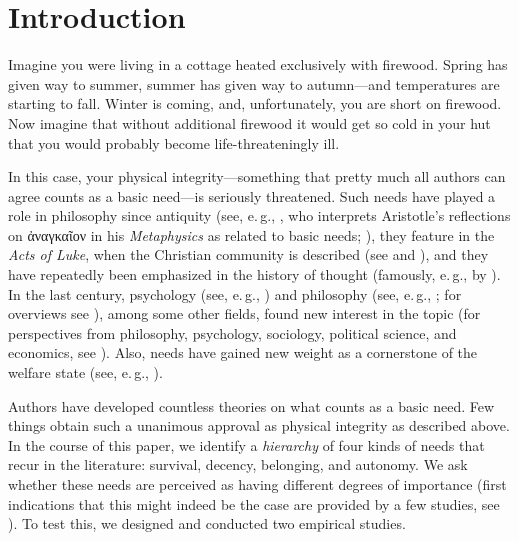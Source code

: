 \documentclass[10pt,letterpaper]{article}
\begin{document}
\linenumbers


\section*{Introduction}\label{sec:introduction}
Imagine you were living in a cottage heated exclusively with firewood.
Spring has given way to summer, summer has given way to autumn---and temperatures are starting to fall.
Winter is coming, and, unfortunately, you are short on firewood.
Now imagine that without additional firewood it would get so cold in your hut that you would probably become life-threateningly ill.

In this case, your physical integrity---something that pretty much all authors can agree counts as a basic need---is seriously threatened.
Such needs have played a role in philosophy since antiquity (see, e.\,g., \cite{poelzler_basic_2021}, who interprets Aristotle's reflections on \textgreek{ἀναγκαῖον} in his \textit{Metaphysics} as related to basic needs; \cite[1015a20--1015b15]{aristotle_metaphysics_1933}), they feature in the \textit{Acts of Luke}, when the Christian community is described (see \cite[p. 141f.]{luke_apostelgeschichte_2016} and \cite[p.~302f.]{bauer_gerechtigkeit_2019}), and they have repeatedly been emphasized in the history of thought (famously, e.\,g., by \cite{marx_kritik_1969}).
In the last century, psychology (see, e.\,g., \cite{maslow_theory_1943,alderfer_existence_1972}) and philosophy (see, e.\,g., \cite{thomson_need_1987,miller_principles_1999,hamilton_political_2003}; for overviews see \cite{brock_needs_2019,miller_needs_2020,siebel_need-based_2020,poelzler_basic_2021}), among some other fields, found new interest in the topic (for perspectives from philosophy, psychology, sociology, political science, and economics, see \cite{traub_need-based_2020}).
Also, needs have gained new weight as a cornerstone of the welfare state (see, e.\,g., \cite{esping-andersen_three_1990}).

Authors have developed countless theories on what counts as a basic need.
Few things obtain such a unanimous approval as physical integrity as described above.
In the course of this paper, we identify a \textit{hierarchy} of four kinds of needs that recur in the literature: survival, decency, belonging, and autonomy.
We ask whether these needs are perceived as having different degrees of importance (first indications that this might indeed be the case are provided by a few studies, see \cite{poelzler_typicality_2022,bauer_needs_forthcoming}).
To test this, we designed and conducted two empirical studies.
\end{document}
